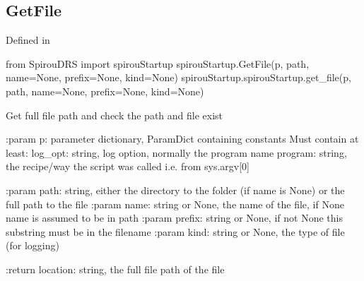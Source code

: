 \noindent\begin{minipage}{\textwidth}
\subsection{GetFile}

Defined in \spirouStartup{}

\begin{pythonbox}
from SpirouDRS import spirouStartup
spirouStartup.GetFile(p, path, name=None, prefix=None, kind=None)
spirouStartup.spirouStartup.get_file(p, path, name=None, prefix=None, kind=None)
\end{pythonbox}

\begin{pythondocstring}
Get full file path and check the path and file exist

:param p: parameter dictionary, ParamDict containing constants
    Must contain at least:
            log_opt: string, log option, normally the program name
            program: string, the recipe/way the script was called
                     i.e. from sys.argv[0]

:param path: string, either the directory to the folder (if name is None) or
             the full path to the file
:param name: string or None, the name of the file, if None name is assumed
             to be in path
:param prefix: string or None, if not None this substring must be in the
               filename
:param kind: string or None, the type of file (for logging)

:return location: string, the full file path of the file
\end{pythondocstring}
\end{minipage}


